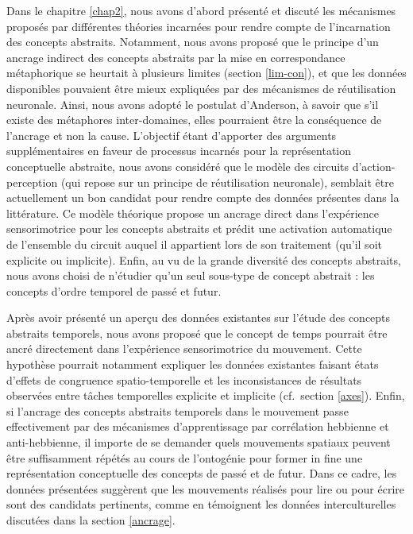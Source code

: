 \documentclass[
  a4paper,12pt,twoside,onecolumn,openright,final,oldfontcommands]{memoir}
\begin{document}
Dans le chapitre \ref{chap2}, nous avons d'abord présenté et discuté les mécanismes proposés par différentes théories incarnées pour rendre compte de l'incarnation des concepts abstraits. Notamment, nous avons proposé que le principe d'un ancrage indirect des concepts abstraits par la mise en correspondance métaphorique se heurtait à plusieurs limites (section \ref{lim-con}), et que les données disponibles pouvaient être mieux expliquées par des mécanismes de réutilisation neuronale. Ainsi, nous avons adopté le postulat d'Anderson, à savoir que s'il existe des métaphores inter-domaines, elles pourraient être la conséquence de l'ancrage et non la cause. L'objectif étant d'apporter des arguments supplémentaires en faveur de processus incarnés pour la représentation conceptuelle abstraite, nous avons considéré que le modèle des circuits d'action-perception (qui repose sur un principe de réutilisation neuronale), semblait être actuellement un bon candidat pour rendre compte des données présentes dans la littérature. Ce modèle théorique propose un ancrage direct dans l'expérience sensorimotrice pour les concepts abstraits et prédit une activation automatique de l'ensemble du circuit auquel il appartient lors de son traitement (qu'il soit explicite ou implicite). Enfin, au vu de la grande diversité des concepts abstraits, nous avons choisi de n'étudier qu'un seul sous-type de concept abstrait : les concepts d'ordre temporel de passé et futur.

Après avoir présenté un aperçu des données existantes sur l'étude des concepts abstraits temporels, nous avons proposé que le concept de temps pourrait être ancré directement dans l'expérience sensorimotrice du mouvement. Cette hypothèse pourrait notamment expliquer les données existantes faisant états d'effets de congruence spatio-temporelle et les inconsistances de résultats observées entre tâches temporelles explicite et implicite (cf.~section \ref{axes}). Enfin, si l'ancrage des concepts abstraits temporels dans le mouvement passe effectivement par des mécanismes d'apprentissage par corrélation hebbienne et anti-hebbienne, il importe de se demander quels mouvements spatiaux peuvent être suffisamment répétés au cours de l'ontogénie pour former in fine une représentation conceptuelle des concepts de passé et de futur. Dans ce cadre, les données présentées suggèrent que les mouvements réalisés pour lire ou pour écrire sont des candidats pertinents, comme en témoignent les données interculturelles discutées dans la section \ref{ancrage}.

\newpage
\end{document}
